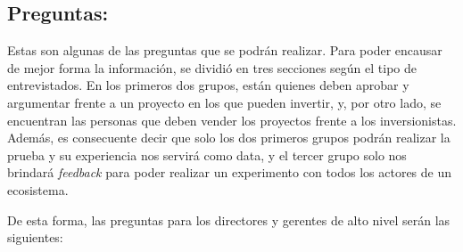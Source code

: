 \documentclass[11pt,letterpaper]{article}
\begin{document}
\subsection{Preguntas:}

Estas son algunas de las preguntas que se podrán realizar. Para poder encausar de mejor forma la información, se dividió en tres secciones según el tipo de entrevistados. En los primeros dos grupos, están quienes deben aprobar y argumentar frente a un proyecto en los que pueden invertir, y, por otro lado, se encuentran las personas que deben vender los proyectos frente a los inversionistas. Además, es consecuente decir que solo los dos primeros grupos podrán realizar la prueba y su experiencia nos servirá como data, y el tercer grupo solo nos brindará \textit{feedback} para poder realizar un experimento con todos los actores de un ecosistema.

De esta forma, las preguntas para los directores y gerentes de alto nivel serán las siguientes:
\end{document}
